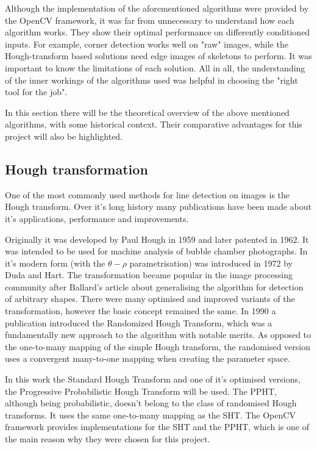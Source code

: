 Although the implementation of the aforementioned algorithms were provided by the OpenCV framework, it was far from unnecessary to understand how each algorithm works.
They show their optimal performance on differently conditioned inputs.
For example, corner detection works well on "raw" images, while the Hough-transform based solutions need edge images of skeletons to perform.
It was important to know the limitations of each solution.
All in all, the understanding of the inner workings of the algorithms used was helpful in choosing the "right tool for the job".

In this section there will be the theoretical overview of the above mentioned algorithms, with some historical context.
Their comparative advantages for this project will also be highlighted.

\subsection{Hough transformation}

One of the most commonly used methods for line detection on images is the Hough transform.
Over it's long history many publications have been made about it's applications, performance and improvements.

Originally it was developed by Paul Hough in 1959 and later patented in 1962\cite{houghPatent}.
It was intended to be used for machine analysis of bubble chamber photographs.
In it's modern form (with the $\theta-\rho$ parametrisation) was introduced in 1972 by Duda and Hart\cite{houghThetaRho}.
The transformation became popular in the image processing community after Ballard's article\cite{BALLARD1981111} about generalising the algorithm for detection of arbitrary shapes.
There were many optimised and improved variants of the transformation, however the basic concept remained the same.
In 1990 a publication\cite{XU1990331} introduced the Randomized Hough Transform, which was a fundamentally new approach to the algorithm with notable merits.
As opposed to the one-to-many mapping of the simple Hough transform, the randomised version uses a convergent many-to-one mapping when creating the parameter space.

In this work the Standard Hough Transform and one of it's optimised versions, the Progressive Probabilistic Hough Transform will be used.
The PPHT, although being probabilistic, doesn't belong to the class of randomised Hough transforms.
It uses the same one-to-many mapping as the SHT.
The OpenCV framework provides implementations for the SHT and the PPHT, which is one of the main reason why they were chosen for this project.

